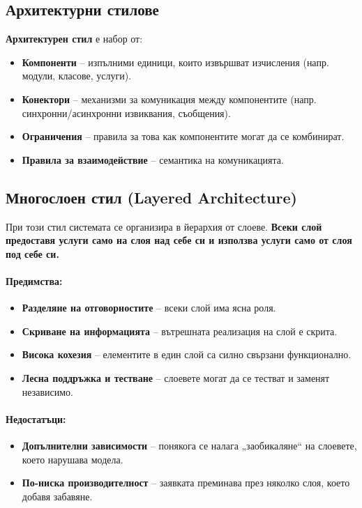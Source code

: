 \documentclass{scrartcl}
\begin{document}
\begin{FlushLeft}
\newpage
\section{Архитектурни стилове}

\textbf{Архитектурен стил} е набор от:
\begin{itemize}
    \item \textbf{Компоненти} – изпълними единици, които извършват изчисления (напр. модули, класове, услуги).
    \item \textbf{Конектори} – механизми за комуникация между компонентите (напр. синхронни/асинхронни извиквания, съобщения).
    \item \textbf{Ограничения} – правила за това как компонентите могат да се комбинират.
    \item \textbf{Правила за взаимодействие} – семантика на комуникацията.
\end{itemize}

\subsection{Многослоен стил (Layered Architecture)}

При този стил системата се организира в йерархия от слоеве. \textbf{Всеки слой предоставя услуги само на слоя над себе си и използва услуги само от слоя под себе си.}

\paragraph{Предимства:}
\begin{itemize}
    \item \textbf{Разделяне на отговорностите} – всеки слой има ясна роля.
    \item \textbf{Скриване на информацията} – вътрешната реализация на слой е скрита.
    \item \textbf{Висока кохезия} – елементите в един слой са силно свързани функционално.
    \item \textbf{Лесна поддръжка и тестване} – слоевете могат да се тестват и заменят независимо.
\end{itemize}

\paragraph{Недостатъци:}
\begin{itemize}
    \item \textbf{Допълнителни зависимости} – понякога се налага „заобикаляне“ на слоевете, което нарушава модела.
    \item \textbf{По-ниска производителност} – заявката преминава през няколко слоя, което добавя забавяне.
\end{itemize}


\end{FlushLeft}
\end{document}
